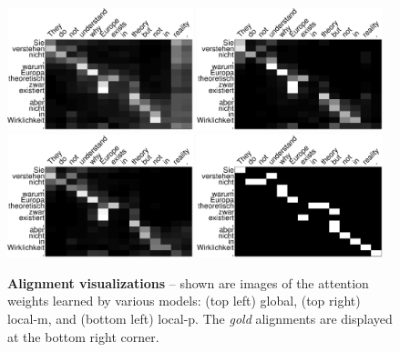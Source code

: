 \begin{figure}
  \begin{center}
    \includegraphics[width=0.48\textwidth]{img/4-align4.eps}
    \includegraphics[width=0.48\textwidth]{img/4-align2.eps}
    \includegraphics[width=0.48\textwidth]{img/4-align1.eps}
    \includegraphics[width=0.48\textwidth]{img/4-alignGold.eps}
  \end{center}
  \caption{{\bf Alignment visualizations} -- shown are images of the attention
  weights learned by various models: (top left) global, (top right)
  local-m, and (bottom left) local-p. The {\it gold} alignments are
  displayed at the bottom right corner.
  }
  \label{i:alignment}
\end{figure}

